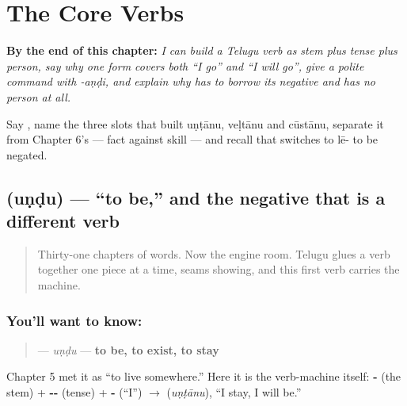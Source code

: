 
\chapter{The Core Verbs}
\label{ch:te-core-verbs}

\begin{chapteropening}
\textbf{By the end of this chapter:} \emph{I can build a Telugu verb as stem plus tense plus person, say why one form covers both \textquotedblleft{}I go\textquotedblright{} and \textquotedblleft{}I will go\textquotedblright{}, give a polite command with -aṇḍi, and explain why  has to borrow its negative and  has no person at all.}

Say  , name the three slots that built uṇṭānu, veḷtānu and cūstānu, separate it from Chapter 6's    — fact against skill — and recall that  switches to lē- to be negated.
\end{chapteropening}

\section[\texorpdfstring{\te{ఉండు} (uṇḍu)}{ఉండు (uṇḍu)}]{ (uṇḍu) — \textquotedblleft{}to be,\textquotedblright{} and the negative that is a different verb}

\label{lesson:TE-C32-undu}



\begin{quote}
Thirty-one chapters of words. Now the engine room. Telugu glues a verb together one piece at a time, seams showing, and this first verb carries the machine.
\end{quote}

\subsection*{You'll want to know: }
\begin{quote}
\textbf{} — \emph{uṇḍu} — \textbf{to be, to exist, to stay}
\end{quote}

Chapter 5 met it as \textquotedblleft{}to live somewhere.\textquotedblright{} Here it is the verb-machine itself: \textbf{-} (the stem) + \textbf{--} (tense) + \textbf{-} (\textquotedblleft{}I\textquotedblright{}) $\to$ \textbf{} (\emph{uṇṭānu}), \textquotedblleft{}I stay, I will be.\textquotedblright{}


